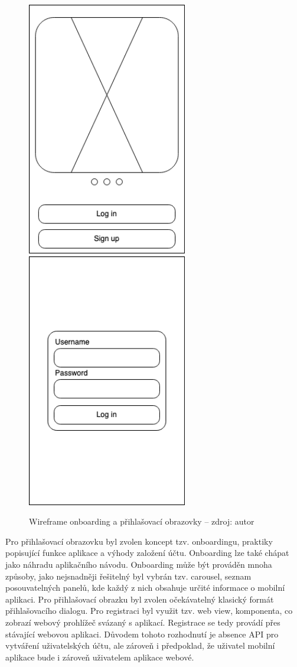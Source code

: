 \begin{figure}[H]
	\begin{center}
		\includegraphics[width=70mm]{img/wf_onboarding.png}
		\includegraphics[width=70mm]{img/wf_login.png}
	\end{center}
	\caption[Wireframe přihlášení a onboarding obrazovky]{Wireframe onboarding a přihlašovací obrazovky -- zdroj: autor}
\end{figure}

Pro přihlašovací obrazovku byl zvolen koncept tzv. onboardingu, praktiky popisující funkce aplikace a výhody založení účtu. Onboarding lze také chápat jako náhradu aplikačního návodu. Onboarding může být prováděn mnoha způsoby, jako nejsnadněji řešitelný byl vybrán tzv. carousel, seznam posouvatelných panelů, kde každý z nich obsahuje určité informace o mobilní aplikaci. Pro přihlašovací obrazku byl zvolen očekávatelný klasický formát přihlašovacího dialogu. Pro registraci byl využit tzv. web view, komponenta, co zobrazí webový prohlížeč svázaný s aplikací. Registrace se tedy provádí přes stávající webovou aplikaci. Důvodem tohoto rozhodnutí je absence API pro vytváření uživatelských účtu, ale zároveň i předpoklad, že uživatel mobilní aplikace bude i zároveň uživatelem aplikace webové.

